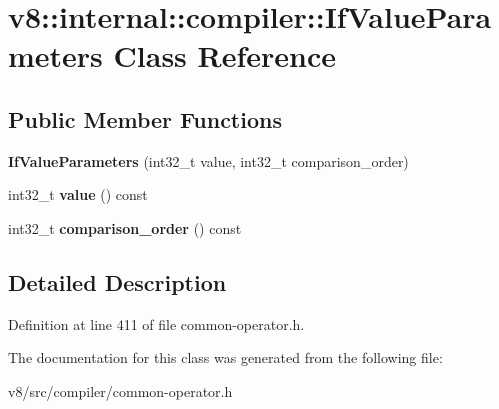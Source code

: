 \hypertarget{classv8_1_1internal_1_1compiler_1_1IfValueParameters}{}\section{v8\+:\+:internal\+:\+:compiler\+:\+:If\+Value\+Parameters Class Reference}
\label{classv8_1_1internal_1_1compiler_1_1IfValueParameters}
\subsection*{Public Member Functions}
\begin{DoxyCompactItemize}
\item 
\mbox{\label{classv8_1_1internal_1_1compiler_1_1IfValueParameters_a749496764bb799690fcb22cc9c4cebbb}} 
{\bfseries If\+Value\+Parameters} (int32\+\_\+t value, int32\+\_\+t comparison\+\_\+order)
\item 
\mbox{\label{classv8_1_1internal_1_1compiler_1_1IfValueParameters_a7948d39c6fcddf702c2169d2517c8451}} 
int32\+\_\+t {\bfseries value} () const
\item 
\mbox{\label{classv8_1_1internal_1_1compiler_1_1IfValueParameters_a42ba76ac5af3b14c51838194c0b21a2c}} 
int32\+\_\+t {\bfseries comparison\+\_\+order} () const
\end{DoxyCompactItemize}


\subsection{Detailed Description}


Definition at line 411 of file common-\/operator.\+h.



The documentation for this class was generated from the following file\+:\begin{DoxyCompactItemize}
\item 
v8/src/compiler/common-\/operator.\+h\end{DoxyCompactItemize}
